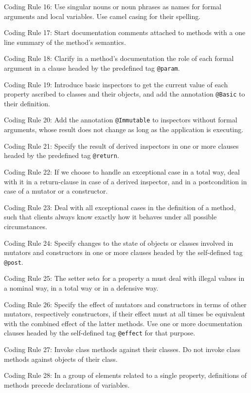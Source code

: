 \documentclass{article}
\begin{document}
\par Coding Rule 16: Use singular nouns or noun phrases as names for formal arguments and local variables. Use camel casing for their spelling.
\par Coding Rule 17: Start documentation comments attached to methods with a one line summary of the method's semantics.
\par Coding Rule 18: Clarify in a method's documentation the role of each formal argument in a clause headed by the predefined tag \texttt{@param}.
\par Coding Rule 19: Introduce basic inspectors to get the current value of each property ascribed to classes and their objects, and add the annotation \texttt{@Basic} to their definition.
\par Coding Rule 20: Add the annotation \texttt{@Immutable} to inspectors without formal arguments, whose result does not change as long as the application is executing.
\par Coding Rule 21: Specify the result of derived inspectors in one or more clauses headed by the predefined tag \texttt{@return}.
\par Coding Rule 22: If we choose to handle an exceptional case in a total way, deal with it in a return-clause in case of a derived inspector, and in a postcondition in case of a mutator or a constructor.
\par Coding Rule 23: Deal with all exceptional cases in the definition of a method, such that clients always know exactly how it behaves under all possible circumstances.
\par Coding Rule 24: Specify changes to the state of objects or classes involved in mutators  and constructors in one or more clauses headed by the self-defined tag \texttt{@post}.
\par Coding Rule 25: The setter set$\alpha$ for a property a must deal with illegal values in a nominal way, in a total way or in a defensive way.
\par Coding Rule 26: Specify the effect of mutators and constructors in terms of other mutators, respectively constructors, if their effect must at all times be equivalent with  the combined effect of the latter methods. Use one or more documentation clauses headed by the self-defined tag \texttt{@effect} for that purpose.
\par Coding Rule 27: Invoke class methods against their classes. Do not invoke class methods  against objects of their class.
\par Coding Rule 28: In a group of elements related to a single property, definitions of methods precede declarations of variables.
\end{document}
